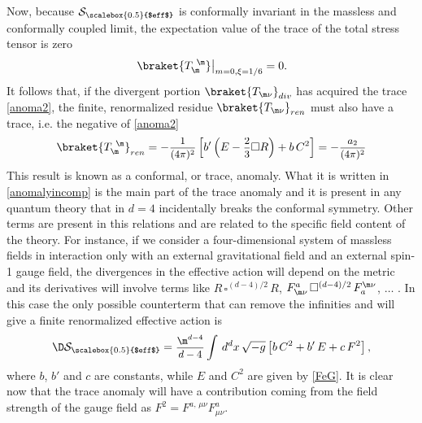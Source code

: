 \documentclass[a4paper,11pt,openright,twoside]{book}
\let\n=\nu      \let\x=\xi     \let\p=\pi      \let\r=\rho
\newcommand{\sdfrac}[2]{\mbox{\small$\displaystyle\frac{#1}{#2}$}}
\numberwithin{equation}{section}
\begin{document}
{{{{		Now, because $\mathcal{S}_{\scalebox{0.5}{$eff$}}$ is conformally invariant in the massless and conformally coupled limit, the expectation value of the trace of the total stress tensor is zero
		\begin{equation}
			\left.\braket{T_\m^{\ \m}}\right|_{m=0,\x=1/6}=0.
		\end{equation}
		It follows that, if the divergent portion $\braket{T_{\m\n}}_{div}$ has acquired the trace \eqref{anoma2}, the finite, renormalized residue $\braket{T_{\m\n}}_{ren}$ must also have a trace, i.e. the negative of \eqref{anoma2}
		\begin{equation}
			\braket{T_{\m}^{\ \m}}_{ren}=-\sdfrac{1}{(4\pi)^2}\left[b'\left(E-\sdfrac{2}{3}\square R\right)+b\,C^2\right]=-\sdfrac{a_2}{(4\pi)^2}\label{anomalyincomp}
		\end{equation}
		This result is known as a conformal, or trace, anomaly. What it is written in \eqref{anomalyincomp} is the main part of the trace anomaly and it is present in any quantum theory that in $d=4$ incidentally breaks the conformal symmetry. Other terms are present in this relations and are related to the specific field content of the theory. For instance, if we consider a four-dimensional system of massless fields in interaction only with an external gravitational field and an external spin-1 gauge field, the divergences in the effective action will depend on the metric and its derivatives will involve terms like $R\,\square^{(d-4)/2}\,R$, $F^a_{\m\n}\,\square^{(d-4)/2}\,F^{\m\n}_a$, $\dots$ . In this case the only possible counterterm that can remove the infinities and will give a finite renormalized effective action is
		\begin{equation}
			\D\mathcal{S}_{\scalebox{0.5}{$eff$}}=\sdfrac{\m^{d-4}}{d-4}\int\,d^dx\,\sqrt{-g}\left[b\,C^2+b'\,E+c\,F^2\right],\label{countert}
		\end{equation}
		where $b$, $b'$ and $c$ are constants, while $E$ and $C^2$ are given by \eqref{FeG}. It is clear now that the trace anomaly will have a contribution coming from the field strength of the gauge field as $F^2=F^{a,\,\mu\nu}F_{\mu\nu}^a$. 
	}
	
}}}
\end{document}
